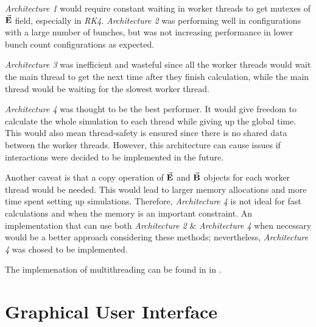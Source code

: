\documentclass[a4paper,oneside,12pt]{report}
\numberwithin{equation}{chapter}
\begin{document}
\textit{Architecture 1} would require constant waiting in worker threads to get mutexes of $\vec{\textbf{E}}$ field, especially in \textit{RK4}.
\clearpage
\textit{Architecture 2} was performing well in configurations with a large number of bunches, but was not increasing performance in lower bunch count configurations as expected.

\textit{Architecture 3} was inefficient and wasteful since all the worker threads would wait the main thread to get the next time after they finish calculation, while the main thread would be waiting for the slowest worker thread.

\textit{Architecture 4} was thought to be the best performer. It would give freedom to calculate the whole simulation to each thread while giving up the global time.
This would also mean thread-safety is ensured since there is no shared data between the worker threads. 
However, this architecture can cause issues if \ee interactions were decided to be implemented in the future.

Another caveat is that a copy operation of $\vec{\textbf{E}}$ and $\vec{\textbf{B}}$ objects for each worker thread would be needed.
This would lead to larger memory allocations and more time spent setting up simulations. 
Therefore, \textit{Architecture 4} is not ideal for fast calculations and when the memory is an important constraint.
An implementation that can use both \textit{Architecture 2} \& \textit{Architecture 4} when necessary would be a better approach considering these methods;
nevertheless, \textit{Architecture 4} was chosed to be implemented.

The implemenation of multithreading can be found in  in .



\clearpage
\section{Graphical User Interface}
\end{document}
